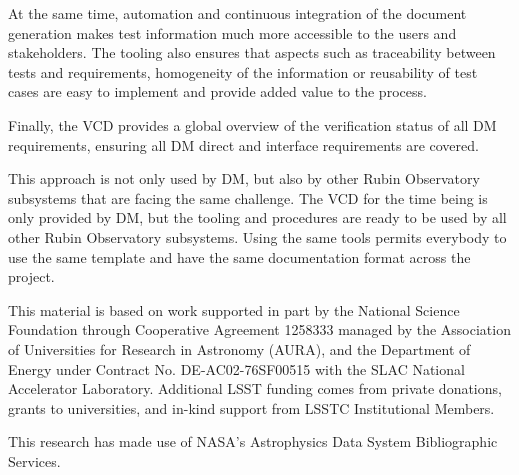 At the same time, automation and continuous integration of the document generation makes test information
much more accessible to the users and stakeholders.
The tooling also ensures that aspects such as traceability between tests and requirements, homogeneity of the information
or reusability of test cases are easy to implement and provide added value to the process.

Finally, the VCD provides a global overview of the verification status of all DM requirements, ensuring all DM direct and interface requirements are covered.

This approach is not only used by DM, but also by other Rubin Observatory subsystems that are facing the same challenge.
The VCD for the time being is only provided by DM, but the tooling and procedures are ready to be used by all other Rubin Observatory subsystems.
Using the same tools permits everybody to use the same template and have the same documentation format across the project.


\acknowledgments
This material is based on work supported in part by the  {National Science Foundation} through Cooperative Agreement 1258333 managed by the  {Association of Universities for Research in Astronomy} ({AURA}), and the  {Department of Energy} under  {Contract} No.  {DE}-AC02-76SF00515 with the  {SLAC} National Accelerator Laboratory. Additional LSST funding comes from private donations, grants to universities, and in-kind support from LSSTC Institutional Members.

This research has made use of  NASA's Astrophysics Data System Bibliographic Services.
